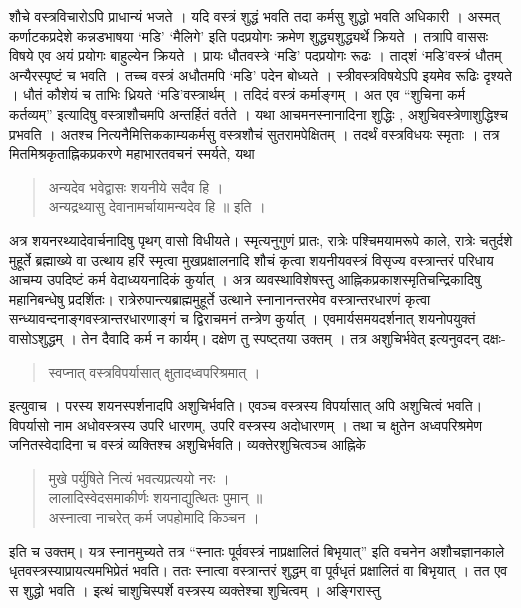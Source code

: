 शौचे वस्त्रविचारोऽपि प्राधान्यं भजते । यदि वस्त्रं शुद्धं भवति तदा कर्मसु शुद्धो भवति अधिकारी । अस्मत् कर्णाटकप्रदेशे कन्नडभाषया ‘मडि’ ‘मैलिगे’ इति पदप्रयोगः क्रमेण शुद्ध्यशुद्ध्यर्थे क्रियते । तत्रापि वाससः विषये एव अयं प्रयोगः बाहुल्येन क्रियते । प्रायः धौतवस्त्रे ‘मडि’ पदप्रयोगः रूढः । ताद्शं ‘मडि’वस्त्रं धौतम् अन्यैरस्पृष्टं च भवति । तच्च वस्त्रं अधौतमपि ‘मडि’ पदेन बोध्यते । स्त्रीवस्त्रविषयेऽपि इयमेव रूढिः दृश्यते । धौतं कौशेयं च ताभिः ध्रियते ‘मडि’वस्त्रार्थम् । तदिदं वस्त्रं कर्माङ्गम् । अत एव “शुचिना कर्म कर्तव्यम्” इत्यादिषु वस्त्राशौचमपि अन्तर्हितं वर्तते । यथा आचमनस्नानादिना शुद्धिः , अशुचिवस्त्रेणाशुद्धिश्च प्रभवति । अतश्च नित्यनैमित्तिककाम्यकर्मसु वस्त्रशौचं सुतरामपेक्षितम् । तदर्थं वस्त्रविधयः स्मृताः । तत्र मितमिश्रकृताह्निकप्रकरणे महाभारतवचनं स्मर्यते, यथा 
\begin{verse}
अन्यदेव भवेद्वासः शयनीये सदैव हि ।\\
अन्यद्रथ्यासु देवानामर्चायामन्यदेव हि ॥ इति ।
\end{verse}
अत्र शयनरथ्यादेवार्चनादिषु  पृथग् वासो विधीयते। स्मृत्यनुगुणं प्रातः, रात्रेः पश्चिमयामरूपे काले, रात्रेः चतुर्दशे मुहूर्ते ब्रह्माख्ये वा उत्थाय हरिं स्मृत्वा मुखप्रक्षालनादि शौचं कृत्वा शयनीयवस्त्रं विसृज्य वस्त्रान्तरं परिधाय आचम्य उपदिष्टं कर्म वेदाध्ययनादिकं कुर्यात् । अत्र व्यवस्थाविशेषस्तु आह्निकप्रकाशस्मृतिचन्द्रिकादिषु महानिबन्धेषु प्रदर्शितः। रात्रेरुपान्त्यब्राह्ममुहूर्ते उत्थाने स्नानानन्तरमेव वस्त्रान्तरधारणं कृत्वा सन्ध्यावन्दनाङ्गवस्त्रान्तरधारणाङ्गं च द्विराचमनं तन्त्रेण कुर्यात् । एवमार्यसमयदर्शनात् शयनोपयुक्तं वासोऽशुद्धम् । तेन दैवादि कर्म न कार्यम्। दक्षेण तु स्पष्ट्तया उक्तम् । तत्र अशुचिर्भवेत् इत्यनुवदन् दक्षः- 
\begin{verse}
स्वप्नात् वस्त्रविपर्यासात् क्षुतादध्वपरिश्रमात् । 
\end{verse}
इत्युवाच । परस्य शयनस्पर्शनादपि अशुचिर्भवति। एवञ्च वस्त्रस्य विपर्यासात् अपि अशुचित्वं भवति। विपर्यासो नाम अधोवस्त्रस्य उपरि धारणम्, उपरि वस्त्रस्य अदोधारणम् । तथा च क्षुतेन अध्वपरिश्रमेण जनितस्वेदादिना च वस्त्रं व्यक्तिश्च अशुचिर्भवति। व्यक्तेरशुचित्वञ्च आह्निके 
\begin{verse}
मुखे पर्युषिते नित्यं भवत्यप्रत्ययो नरः । \\
लालादिस्वेदसमाकीर्णः शयनाद्युत्थितः पुमान् ॥\\
अस्नात्वा नाचरेत् कर्म जपहोमादि किञ्चन ।
\end{verse}
इति च उक्तम्। यत्र स्नानमुच्यते तत्र “स्नातः पूर्ववस्त्रं नाप्रक्षालितं बिभृयात्” इति वचनेन अशौचज्ञानकाले धृतवस्त्रस्याप्रायत्यमभिप्रेतं भवति। ततः स्नात्वा वस्त्रान्तरं शुद्धम् वा पूर्वधृतं प्रक्षालितं वा बिभृयात् । तत एव स शुद्धो भवति । इत्थं चाशुचिस्पर्शे वस्त्रस्य व्यक्तेश्चा शुचित्वम् । अङ्गिरास्तु 
